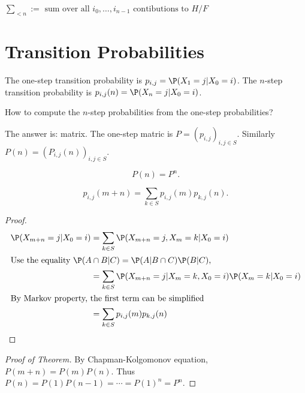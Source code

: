 \documentclass[a4paper]{article}
\begin{document}
\begin{notation}
  $\sum_{<n} := \text{ sum over all } i_0,\ldots, i_{n-1} \text{ contibutions to } H/F$
\end{notation}

\section{Transition Probabilities}

The one-step transition probability is $p_{i,j} = \P(X_1=j|X_0=i)$. The $n$-step transition probability is $p_{i,j}(n) = \P(X_n=j|X_0=i)$.

\begin{question}
  How to compute the $n$-step probabilities from the one-step probabilities?
\end{question}

The answer is: matrix. The one-step matric is $P=(p_{i,j})_{i,j\in S}$. Similarly $P(n) = (P_{i,j}(n))_{i,j\in S}$.

\begin{thm}
  \[
    P(n) = P^n.
  \]
\end{thm}

\begin{prop}
  \[
    p_{i,j}(m+n) = \sum_{k\in S} p_{i,j}(m) p_{k,j}(n).
  \]
 
\end{prop}

\begin{proof}
  \begin{align*}
    \P(X_{m+n}=j|X_0=i) &= \sum_{k\in S} \P(X_{m+n}=j,X_m=k|X_0=i) \\
    \intertext{Use the equality $\P(A\cap B|C) = \P(A|B\cap C)\P(B|C)$,}
                        &= \sum_{k\in S} \P(X_{m+n}=j| X_m=k,X_0=i)\P(X_m=k|X_0=i) \\
    \intertext{By Markov property, the first term can be simplified}
                        &= \sum_{k\in S} p_{i,j}(m) p_{k,j}(n)
  \end{align*}
\end{proof}

\begin{proof}[Proof of Theorem]
  By Chapman-Kolgomonov equation, $P(m+n) = P(m)P(n)$. Thus $P(n) = P(1)P(n-1)=\cdots =P(1)^n=P^n$.
\end{proof}
\end{document}
